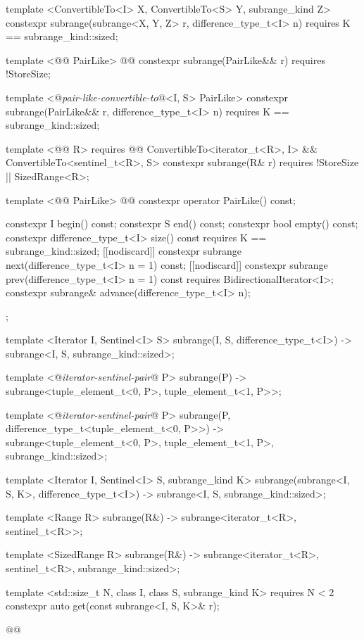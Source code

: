 \begin{codeblock}
{{{    template <ConvertibleTo<I> X, ConvertibleTo<S> Y, subrange_kind Z>
    constexpr subrange(subrange<X, Y, Z> r, difference_type_t<I> n)
      requires K == subrange_kind::sized;

    template <@@ PairLike>
      @@
    constexpr subrange(PairLike&& r) requires !StoreSize;

    template <@\textit{pair-like-convertible-to}@<I, S> PairLike>
    constexpr subrange(PairLike&& r, difference_type_t<I> n)
      requires K == subrange_kind::sized;

    template <@@ R>
      requires @@ ConvertibleTo<iterator_t<R>, I> && ConvertibleTo<sentinel_t<R>, S>
    constexpr subrange(R& r) requires !StoreSize || SizedRange<R>;

    template <@@ PairLike>
      @@
    constexpr operator PairLike() const;

    constexpr I begin() const;
    constexpr S end() const;
    constexpr bool empty() const;
    constexpr difference_type_t<I> size() const
      requires K == subrange_kind::sized;
    [[nodiscard]] constexpr subrange next(difference_type_t<I> n = 1) const;
    [[nodiscard]] constexpr subrange prev(difference_type_t<I> n = 1) const
      requires BidirectionalIterator<I>;
    constexpr subrange& advance(difference_type_t<I> n);
  };

  template <Iterator I, Sentinel<I> S>
  subrange(I, S, difference_type_t<I>) -> subrange<I, S, subrange_kind::sized>;

  template <@\textit{iterator-sentinel-pair}@ P>
  subrange(P) ->
    subrange<tuple_element_t<0, P>, tuple_element_t<1, P>>;

  template <@\textit{iterator-sentinel-pair}@ P>
  subrange(P, difference_type_t<tuple_element_t<0, P>>) ->
    subrange<tuple_element_t<0, P>, tuple_element_t<1, P>, subrange_kind::sized>;

  template <Iterator I, Sentinel<I> S, subrange_kind K>
  subrange(subrange<I, S, K>, difference_type_t<I>) ->
    subrange<I, S, subrange_kind::sized>;

  template <Range R>
  subrange(R&) -> subrange<iterator_t<R>, sentinel_t<R>>;

  template <SizedRange R>
  subrange(R&) -> subrange<iterator_t<R>, sentinel_t<R>, subrange_kind::sized>;

  template <std::size_t N, class I, class S, subrange_kind K>
    requires N < 2
  constexpr auto get(const subrange<I, S, K>& r);
}}@\removed{\}\}}@
\end{codeblock}

